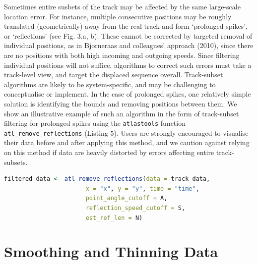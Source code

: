 \documentclass[10pt,paper=a4,headings=standardclasses
]{scrartcl}
\begin{document}
Sometimes entire susbets of the track may be affected by the same large-scale location error.
For instance, multiple consecutive positions may be roughly translated (geometrically) away from the real track and form `prolonged spikes', or `reflections' (see Fig. 3.a, b).
These cannot be corrected by targeted removal of individual positions, as in Bjorneraas and colleagues' approach (2010), since there are no positions with both high incoming and outgoing speeds.
Since filtering individual positions will not suffice, algorithms to correct such errors must take a track-level view, and target the displaced sequence overall.
Track-subset algorithms are likely to be system-specific, and may be challenging to conceptualise or implement.
In the case of prolonged spikes, one relatively simple solution is identifying the bounds and removing positions between them.
We show an illustrative example of such an algorithm in the form of track-subset filtering for prolonged spikes using the \texttt{atlastools} function \texttt{atl\_remove\_reflections} (Listing 5).
Users are strongly encouraged to visualise their data before and after applying this method, and we caution against relying on this method if data are heavily distorted by errors affecting entire track-subsets.

\begin{lstlisting}[float, language=R, style=customR, caption = {
    Removing prolonged spikes from a movement track. 
    The important function arguments here are \texttt{point\_angle\_cutoff} ($A$), \texttt{reflection\_speed\_cutoff} ($S$), and \texttt{est\_ref\_len}, the maximum number of positions after the inner bound that are candidates for the end of the prolonged spike, i.e., the outer bound. 
    If the prolonged spike ends after less than $N$ positions, the true end point is used as the outer bound of the spike.
    However, the algorithm behind this function fails when the prolonged spike ends after more than $N$ positions. 
    Users are advised to use a liberally large value of N in the \texttt{est\_ref\_len} argument; 1,000 may be appropriate for 3s interval data.
    Further, users are cautioned against relying on such algorithms for severely distorted data.}]
filtered_data <- atl_remove_reflections(data = track_data,
                       x = "x", y = "y", time = "time",
                       point_angle_cutoff = A,
                       reflection_speed_cutoff = S,
                       est_ref_len = N)
\end{lstlisting}

\section{Smoothing and Thinning Data}
\end{document}
